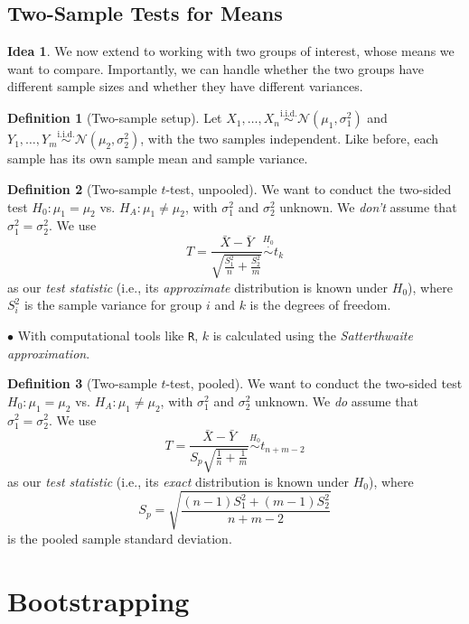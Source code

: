 \documentclass[12pt,oneside]{article}
\newcommand{\N}{\mathcal{N}}
\newcommand{\simiid}{\overset{\text{i.i.d.}}{\sim}}
\newcommand{\simnull}{\overset{H_0}{\sim}}
\newcommand{\simapprox}{\overset{\cdot}{\sim}}
\newcommand{\simnullapprox}{\overset{H_0}{\simapprox}}
\theoremstyle{definition}
\newtheorem{definition}{Definition}
\newtheorem*{idea}{Idea}
\theoremstyle{remark}
\begin{document}
\subsection{Two-Sample Tests for Means}

\begin{idea}
We now extend to working with two groups of interest, whose means we want to compare. Importantly, we can handle whether the two groups have different sample sizes and whether they have different variances.
\end{idea}

\begin{definition}[Two-sample setup]
Let $X_{1}, \ldots, X_{n} \simiid \N(\mu_{1}, \sigma^2_{1})$ and $Y_{1}, \ldots, Y_{m} \simiid \N(\mu_{2}, \sigma^2_{2})$, with the two samples independent. Like before, each sample has its own sample mean and sample variance.
\end{definition}

\begin{definition}[Two-sample $t$-test, unpooled]
We want to conduct the two-sided test $H_{0}: \mu_1 = \mu_2$ vs. $H_{A}: \mu_1 \neq \mu_2$, with $\sigma^2_1$ and $\sigma^2_2$ unknown. We \textit{don't} assume that $\sigma^2_1 = \sigma^2_2$. We use \[T = \frac{\bar{X} - \bar{Y}}{\sqrt{\frac{S^2_1}{n} + \frac{S^2_2}{m}}} \simnullapprox t_{k}\] as our \textit{test statistic} (i.e., its \textit{approximate} distribution is known under $H_0$), where $S^2_i$ is the sample variance for group $i$ and $k$ is the degrees of freedom.

$\bullet$ With computational tools like \texttt{R}, $k$ is calculated using the \textit{Satterthwaite approximation}.
\end{definition}

\begin{definition}[Two-sample $t$-test, pooled]
We want to conduct the two-sided test $H_{0}: \mu_1 = \mu_2$ vs. $H_{A}: \mu_1 \neq \mu_2$, with $\sigma^2_1$ and $\sigma^2_2$ unknown. We \textit{do} assume that $\sigma^2_1 = \sigma^2_2$. We use \[T = \frac{\bar{X} - \bar{Y}}{S_p \sqrt{\frac{1}{n} + \frac{1}{m}}} \simnull t_{n + m - 2}\] as our \textit{test statistic} (i.e., its \textit{exact} distribution is known under $H_0$), where \[S_p = \sqrt{\frac{(n - 1) S^2_1 + (m - 1) S^2_2}{n + m - 2}}\] is the pooled sample standard deviation.
\end{definition}

\section{Bootstrapping}
\end{document}
